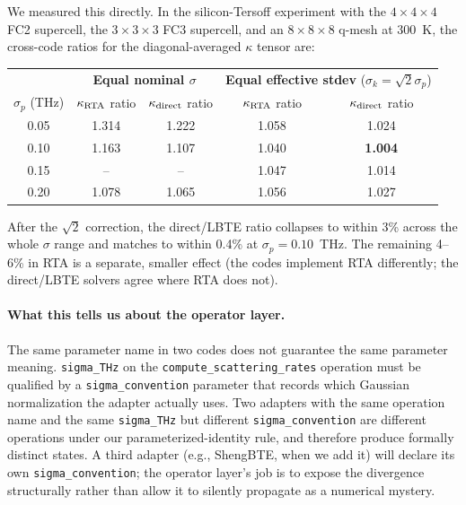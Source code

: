 \documentclass[11pt,a4paper]{article}
\begin{document}
\medskip
We measured this directly. In the silicon-Tersoff experiment with the
$4{\times}4{\times}4$ FC2 supercell, the $3{\times}3{\times}3$ FC3 supercell, and an
$8{\times}8{\times}8$ q-mesh at 300~K, the cross-code ratios for the diagonal-averaged
$\kappa$ tensor are:

\begin{center}
\renewcommand{\arraystretch}{1.15}
\begin{tabular}{c|cc|cc}
\toprule
 & \multicolumn{2}{c|}{\textbf{Equal nominal $\sigma$}} & \multicolumn{2}{c}{\textbf{Equal effective stdev} ($\sigma_k = \sqrt{2}\sigma_p$)} \\
$\sigma_p$ (THz) & $\kappa_{\rm RTA}$ ratio & $\kappa_{\rm direct}$ ratio & $\kappa_{\rm RTA}$ ratio & $\kappa_{\rm direct}$ ratio \\
\midrule
0.05 & 1.314 & 1.222 & 1.058 & 1.024 \\
0.10 & 1.163 & 1.107 & 1.040 & \textbf{1.004} \\
0.15 & --    & --    & 1.047 & 1.014 \\
0.20 & 1.078 & 1.065 & 1.056 & 1.027 \\
\bottomrule
\end{tabular}
\end{center}

\noindent After the $\sqrt{2}$ correction, the direct/LBTE ratio collapses to within
3\% across the whole $\sigma$ range and matches to within 0.4\% at
$\sigma_p = 0.10$~THz. The remaining 4--6\% in RTA is a separate, smaller effect (the
codes implement RTA differently; the direct/LBTE solvers agree where RTA does not).

\paragraph{What this tells us about the operator layer.} The same parameter name in two codes
does not guarantee the same parameter meaning. \texttt{sigma\_THz} on the
\texttt{compute\_scattering\_rates} operation must be qualified by a
\texttt{sigma\_convention} parameter that records which Gaussian normalization the
adapter actually uses. Two adapters with the same operation name and the same
\texttt{sigma\_THz} but different \texttt{sigma\_convention} are different operations
under our parameterized-identity rule, and therefore produce formally distinct states.
A third adapter (e.g., ShengBTE, when we add it) will declare its own
\texttt{sigma\_convention}; the operator layer's job is to expose the divergence
structurally rather than allow it to silently propagate as a numerical mystery.
\end{document}
